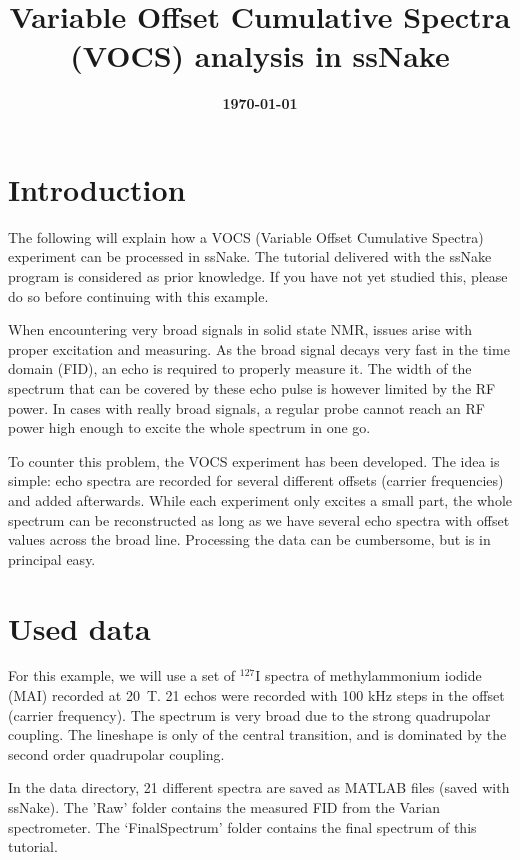 \documentclass[11pt,a4paper]{article}
\title{\color{black}\fontfamily{SourceSansPro-LF}\bfseries Variable Offset Cumulative Spectra (VOCS)
analysis in ssNake}
\author{}
\date{\color{black}\fontfamily{SourceSansPro-LF}\bfseries \today}
\begin{document}

\maketitle

\section{Introduction}
The following will explain how a VOCS (Variable Offset Cumulative Spectra) experiment can be processed in ssNake. The
tutorial delivered with the ssNake program is considered as prior knowledge. If you have not yet
studied this, please do so before continuing with this example.

When encountering very broad signals in solid state NMR, issues arise with proper excitation and
measuring. As the broad signal decays very fast in the time domain (FID), an echo is required to
properly measure it. The width of the spectrum that can be covered by these echo pulse is however
limited by the RF power. In cases with really broad signals, a regular probe cannot reach an RF
power high enough to excite the whole spectrum in one go.

To counter this problem, the VOCS experiment has been developed. The idea is simple: echo spectra
are recorded for several different offsets (carrier frequencies)  and added afterwards. While each
experiment only excites a small part, the whole spectrum can be reconstructed as long as we have
several echo spectra with offset values across the broad line. Processing the data can be
cumbersome, but is in principal easy.

\section{Used data}
For this example, we will use a set of $^{127}$I spectra of methylammonium iodide (MAI) recorded at 20~T.
21 echos were recorded with 100 kHz steps in the offset (carrier frequency). The spectrum is very
broad due to the strong quadrupolar coupling. The lineshape is only of the central transition, and
is dominated by the second order quadrupolar coupling.

In the data directory, 21 different spectra are saved as MATLAB files (saved with ssNake). The 'Raw'
folder contains the measured FID from the Varian spectrometer. The `FinalSpectrum' folder contains
the final spectrum of this tutorial.
\end{document}
